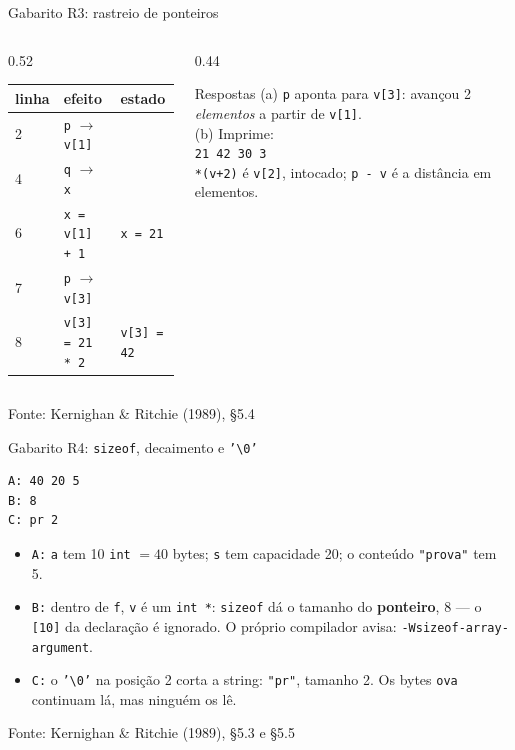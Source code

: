 \documentclass[aspectratio=169]{beamer}
\newcommand{\fonte}[1]{\vfill\hfill{\scriptsize\textcolor{UFSGray}{Fonte: #1}}}
\begin{document}
\begin{frame}{Gabarito R3: rastreio de ponteiros}
  \begin{columns}[T]
    \begin{column}{0.52\textwidth}
      \small
      \begin{tabular}{@{}lll@{}}
        \toprule
        linha & efeito & estado \\
        \midrule
        2 & \texttt{p} $\to$ \texttt{v[1]} & \\
        4 & \texttt{q} $\to$ \texttt{x} & \\
        6 & \texttt{x = v[1] + 1} & \texttt{x = 21} \\
        7 & \texttt{p} $\to$ \texttt{v[3]} & \\
        8 & \texttt{v[3] = 21 * 2} & \texttt{v[3] = 42} \\
        \bottomrule
      \end{tabular}
    \end{column}
    \begin{column}{0.44\textwidth}
      \begin{block}{Respostas}
        \small
        (a) \texttt{p} aponta para \texttt{v[3]}: avançou 2
        \emph{elementos} a partir de \texttt{v[1]}.\\[0.4em]
        (b) Imprime:\\[0.2em]
        \texttt{\large 21 42 30 3}\\[0.4em]
        \texttt{*(v+2)} é \texttt{v[2]}, intocado; \texttt{p - v} é a
        distância em elementos.
      \end{block}
    \end{column}
  \end{columns}
  \fonte{Kernighan \& Ritchie (1989), §5.4~\cite{kernighan1989c}}
\end{frame}

\begin{frame}[fragile]{Gabarito R4: \texttt{sizeof}, decaimento e \texttt{'\textbackslash 0'}}
\begin{lstlisting}[style=shellStyle]
A: 40 20 5
B: 8
C: pr 2
\end{lstlisting}
  \small
  \begin{itemize}
    \item \texttt{A:} \texttt{a} tem 10 \texttt{int} $= 40$ bytes;
      \texttt{s} tem capacidade 20; o conteúdo \texttt{"prova"} tem 5.
    \item \texttt{B:} dentro de \texttt{f}, \texttt{v} é um \texttt{int *}:
      \texttt{sizeof} dá o tamanho do \textbf{ponteiro}, 8 --- o
      \texttt{[10]} da declaração é ignorado. O próprio compilador avisa:
      \texttt{-Wsizeof-array-argument}.
    \item \texttt{C:} o \texttt{'\textbackslash 0'} na posição 2 corta a
      string: \texttt{"pr"}, tamanho 2. Os bytes \texttt{ova} continuam lá,
      mas ninguém os lê.
  \end{itemize}
  \fonte{Kernighan \& Ritchie (1989), §5.3 e §5.5~\cite{kernighan1989c}}
\end{frame}
\end{document}
